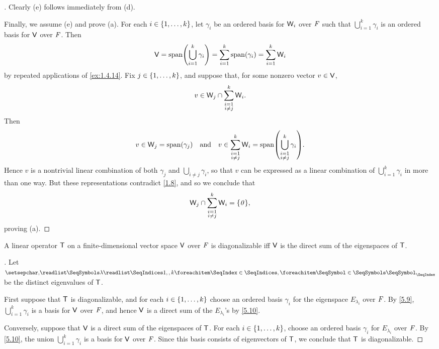 \begin{proof}[]
  Clearly (e) follows immediately from (d).

  Finally, we assume (e) and prove (a).
  For each \(i \in \left\lbrace1, \dots, k\right\rbrace\), let \(\gamma_i\) be an ordered basis for \(\mathsf{W}_i\) over \(\mathit{F}\) such that \(\bigcup_{i = 1}^k \gamma_i\) is an ordered basis for \(\mathsf{V}\) over \(\mathit{F}\).
  Then
  \[
    \V = \spn{\bigcup_{i = 1}^k \gamma_i} = \sum_{i = 1}^k \spn{\gamma_i} = \sum_{i = 1}^k \W_i
  \]
  by repeated applications of \cref{ex:1.4.14}.
  Fix \(j \in \left\lbrace1, \dots, k\right\rbrace\), and suppose that, for some nonzero vector \(v \in \mathsf{V}\),
  \[
    v \in \mathsf{W}_j \cap \sum_{\substack{i = 1 \\ i \neq j}}^k \mathsf{W}_i.
  \]
  Then
  \[
    v \in \W_j = \spn{\gamma_j} \quad \text{and} \quad v \in \sum_{\substack{i = 1 \\ i \neq j}}^k \W_i = \spn{\bigcup_{\substack{i = 1 \\ i \neq j}}^k \gamma_i}.
  \]
  Hence \(v\) is a nontrivial linear combination of both \(\gamma_j\) and \(\bigcup_{i \neq j} \gamma_i\), so that \(v\) can be expressed as a linear combination of \(\bigcup_{i = 1}^k \gamma_i\) in more than one way.
  But these representations contradict \cref{1.8}, and so we conclude that
  \[
    \W_j \cap \sum_{\substack{i = 1 \\ i \neq j}}^k \W_i = \set{\zv},
  \]
  proving (a).
\end{proof}

\begin{thm}\label{5.11}
  A linear operator \(\mathsf{T}\) on a finite-dimensional vector space \(\mathsf{V}\) over \(\mathit{F}\) is diagonalizable iff \(\mathsf{V}\) is the direct sum of the eigenspaces of \(\mathsf{T}\).
\end{thm}

\begin{proof}[]
  Let \(\seq{\lambda}{1,,k}\) be the distinct eigenvalues of \(\mathsf{T}\).

  First suppose that \(\mathsf{T}\) is diagonalizable, and for each \(i \in \left\lbrace1, \dots, k\right\rbrace\) choose an ordered basis \(\gamma_i\) for the eigenspace \(E_{\lambda_i}\) over \(\mathit{F}\).
  By \cref{5.9}, \(\bigcup_{i = 1}^k \gamma_i\) is a basis for \(\mathsf{V}\) over \(\mathit{F}\), and hence \(\mathsf{V}\) is a direct sum of the \(E_{\lambda_i}\)'s by \cref{5.10}.

  Conversely, suppose that \(\mathsf{V}\) is a direct sum of the eigenspaces of \(\mathsf{T}\).
  For each \(i \in \left\lbrace1, \dots, k\right\rbrace\), choose an ordered basis \(\gamma_i\) for \(E_{\lambda_i}\) over \(\mathit{F}\).
  By \cref{5.10}, the union \(\bigcup_{i = 1}^k \gamma_i\) is a basis for \(\mathsf{V}\) over \(\mathit{F}\).
  Since this basis consists of eigenvectors of \(\mathsf{T}\), we conclude that \(\mathsf{T}\) is diagonalizable.
\end{proof}

